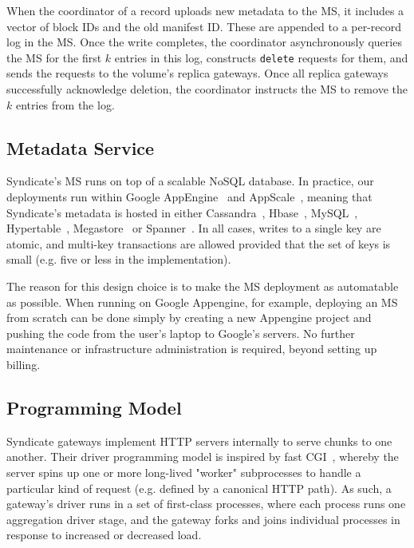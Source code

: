 When the coordinator of a record uploads new metadata to the MS, it includes a
vector of block IDs and the old manifest ID.  These are appended to a per-record
log in the MS.  Once the write completes, the coordinator asynchronously queries
the MS for the first $k$ entries in this log, constructs \texttt{delete}
requests for them, and sends the requests to the volume's replica gateways.
Once all replica gateways successfully acknowledge deletion, the coordinator
instructs the MS to remove the $k$ entries from the log.

\subsection{Metadata Service}

Syndicate's MS runs on top of a scalable NoSQL database.  In practice, our
deployments run within Google AppEngine~\cite{google-appengine} and
AppScale~\cite{appscale}, meaning that
Syndicate's metadata is hosted in either Cassandra~\cite{cassandra},
Hbase~\cite{hbase}, MySQL~\cite{mysql}, Hypertable~\cite{hypertable}, Megastore~\cite{megastore} or
Spanner~\cite{spanner}.  In all cases, writes to a single key are atomic, and
multi-key transactions are allowed provided that the set of keys is small (e.g.
five or less in the implementation).

The reason for this design choice is to make the MS deployment as automatable as
possible.  When running on Google Appengine, for example, deploying an MS from
scratch can be done simply by creating a new Appengine project and pushing the
code from the user's laptop to Google's servers.  No further maintenance or
infrastructure administration is required, beyond setting up billing.

\subsection{Programming Model}

Syndicate gateways implement HTTP servers internally to serve chunks to one
another.  Their driver programming model is inspired by fast CGI~\cite{fastcgi},
whereby the server spins up one or more long-lived "worker" subprocesses to
handle a particular kind of request (e.g. defined by a canonical HTTP path).
As such, a gateway's driver runs in a set of first-class processes, where each
process runs one aggregation driver stage, and the gateway forks and joins
individual processes in response to increased or decreased load.

